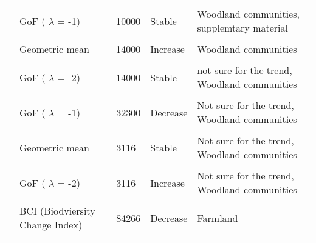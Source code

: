 \documentclass[
  12pt,
  oneside]{report}
\begin{document}
\begin{landscape}
\begin{longtable}[t]{llll>{\raggedright\arraybackslash}p{30em}}
\cite{harrison_assessing_2014} & GoF ( $\lambda$ = -1) & 10000 & Stable & Woodland communities, supplemtary material\\
\cellcolor{gray!6}{\cite{harrison_assessing_2014}} & \cellcolor{gray!6}{GoF ( $\lambda$ = -2)} & \cellcolor{gray!6}{10000} & \cellcolor{gray!6}{Decrease} & \cellcolor{gray!6}{Woodland communities, supplemtary material}\\
\cite{harrison_assessing_2014} & Geometric mean & 14000 & Increase & Woodland communities\\
\cellcolor{gray!6}{\cite{harrison_assessing_2014}} & \cellcolor{gray!6}{GoF ( $\lambda$ = -1)} & \cellcolor{gray!6}{14000} & \cellcolor{gray!6}{Increase} & \cellcolor{gray!6}{Woodland communities}\\
\addlinespace
\cite{harrison_assessing_2014} & GoF ( $\lambda$ = -2) & 14000 & Stable & not sure for the trend, Woodland communities\\
\cellcolor{gray!6}{\cite{harrison_assessing_2014}} & \cellcolor{gray!6}{Geometric mean} & \cellcolor{gray!6}{32300} & \cellcolor{gray!6}{Increase} & \cellcolor{gray!6}{Woodland communities}\\
\cite{harrison_assessing_2014} & GoF ( $\lambda$ = -1) & 32300 & Decrease & Not sure for the trend, Woodland communities\\
\cellcolor{gray!6}{\cite{harrison_assessing_2014}} & \cellcolor{gray!6}{GoF ( $\lambda$ = -2)} & \cellcolor{gray!6}{32300} & \cellcolor{gray!6}{Stable} & \cellcolor{gray!6}{Not sure for the trend, Woodland communities}\\
\cite{harrison_assessing_2014} & Geometric mean & 3116 & Stable & Not sure for the trend, Woodland communities\\
\addlinespace
\cellcolor{gray!6}{\cite{harrison_assessing_2014}} & \cellcolor{gray!6}{GoF ( $\lambda$ = -1)} & \cellcolor{gray!6}{3116} & \cellcolor{gray!6}{Stable} & \cellcolor{gray!6}{Not sure for the trend, Woodland communities}\\
\cite{harrison_assessing_2014} & GoF ( $\lambda$ = -2) & 3116 & Increase & Not sure for the trend, Woodland communities\\
\cellcolor{gray!6}{\cite{juslen_application_2013}} & \cellcolor{gray!6}{RLI (Red list Index)} & \cellcolor{gray!6}{338440} & \cellcolor{gray!6}{Decrease} & \cellcolor{gray!6}{NA}\\
\cite{normander_indicator_2012} & BCI (Biodviersity Change Index) & 84266 & Decrease & Farmland\\
\cellcolor{gray!6}{\cite{normander_indicator_2012}} & \cellcolor{gray!6}{BCI (Biodviersity Change Index)} & \cellcolor{gray!6}{529831} & \cellcolor{gray!6}{Stable} & \cellcolor{gray!6}{Forest}\\

\end{longtable}
\end{landscape}
\end{document}
